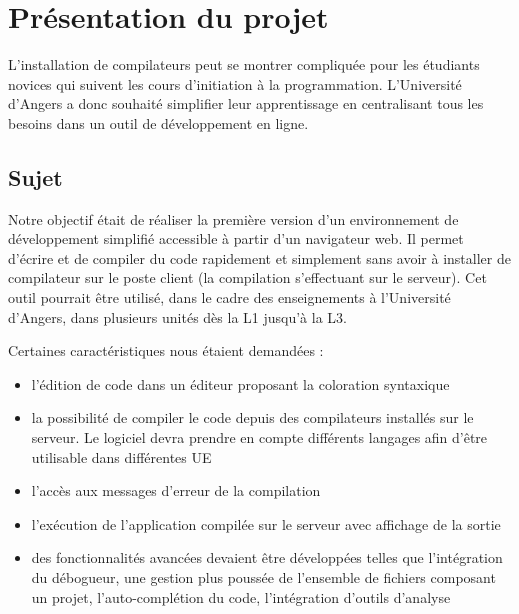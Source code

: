 \chapter{Présentation du projet}

\par L'installation de compilateurs peut se montrer compliquée pour les étudiants novices qui suivent les cours d'initiation à la programmation. L'Université d'Angers a donc souhaité simplifier leur apprentissage en centralisant tous les besoins dans un outil de développement en ligne.

\section{Sujet}

\par Notre objectif était de réaliser la première version d'un environnement de développement simplifié accessible à partir d'un navigateur web. Il permet d'écrire et de compiler du code rapidement et simplement sans avoir à installer de compilateur sur le poste client (la compilation s'effectuant sur le serveur). Cet outil pourrait être utilisé, dans le cadre des enseignements à l'Université d'Angers, dans plusieurs unités dès la L1 jusqu'à la L3. \\

\par Certaines caractéristiques nous étaient demandées :

\begin{itemize}

	\item l'édition de code dans un éditeur proposant la coloration syntaxique
	\item la possibilité de compiler le code depuis des compilateurs installés sur le serveur. Le logiciel devra prendre en compte différents langages afin d’être utilisable dans différentes UE
	\item l'accès aux messages d'erreur de la compilation
	\item l'exécution de l'application compilée sur le serveur avec affichage de la sortie
	\item des fonctionnalités avancées devaient être développées telles que l’intégration du débogueur, une gestion plus poussée de l’ensemble de fichiers composant un projet, l'auto-complétion du code, l'intégration d’outils d’analyse

\end{itemize}


